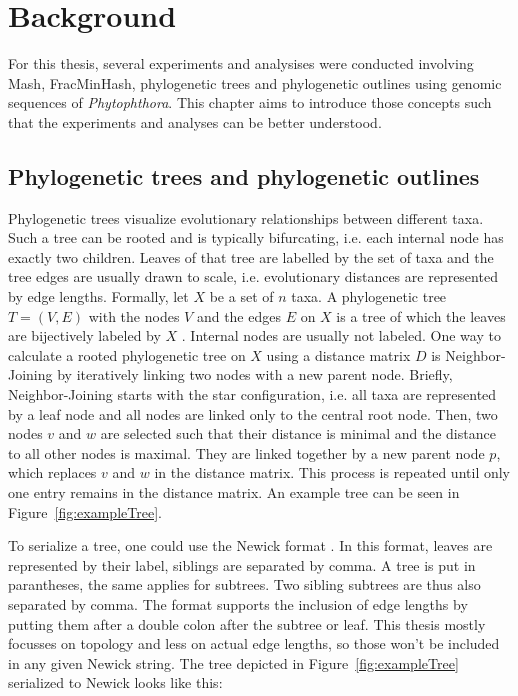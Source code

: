 
\chapter{Background}
  \label{sec:background}

For this thesis, several experiments and analysises were conducted involving
Mash, FracMinHash, phylogenetic trees and phylogenetic outlines using genomic
sequences of \textit{Phytophthora}. This chapter aims to introduce those
concepts such that the experiments and analyses can be better understood.

\section{Phylogenetic trees and phylogenetic outlines}
Phylogenetic trees visualize evolutionary relationships between different taxa.
Such a tree can be rooted and is typically bifurcating, i.e. each internal node
has exactly two children. Leaves of that tree are labelled by the set of taxa
and the tree edges are usually drawn to scale, i.e. evolutionary distances are
represented by edge lengths. Formally, let $X$ be a set of $n$ taxa. A
phylogenetic tree $T = (V, E)$ with the nodes $V$ and the edges $E$ on $X$ is a
tree of which the leaves are bijectively labeled by $X$
\cite{scornavaccaPhylogeneticTrees2010}. Internal nodes are usually not labeled.
One way to calculate a rooted phylogenetic tree on $X$ using a distance matrix
$D$ is Neighbor-Joining \cite{saitouNeighborjoiningMethodNew1987} by iteratively
linking two nodes with a new parent node. Briefly, Neighbor-Joining starts with
the star configuration, i.e. all taxa are represented by a leaf node and all
nodes are linked only to the central root node. Then, two nodes $v$ and $w$ are
selected such that their distance is minimal and the distance to all other nodes
is maximal. They are linked together by a new parent node $p$, which replaces
$v$ and $w$ in the distance matrix. This process is repeated until only one
entry remains in the distance matrix. An example tree can be seen in
Figure~\ref{fig:exampleTree}.

To serialize a tree, one could use the Newick format
\cite{pavlopoulosReferenceGuideTree2010}. In this format, leaves are represented
by their label, siblings are separated by comma. A tree is put in parantheses,
the same applies for subtrees. Two sibling subtrees are thus also separated by
comma. The format supports the inclusion of edge lengths by putting them after a
double colon after the subtree or leaf. This thesis mostly focusses on topology
and less on actual edge lengths, so those won't be included in any given Newick
string. The tree depicted in Figure~\ref{fig:exampleTree} serialized to Newick
looks like this:

